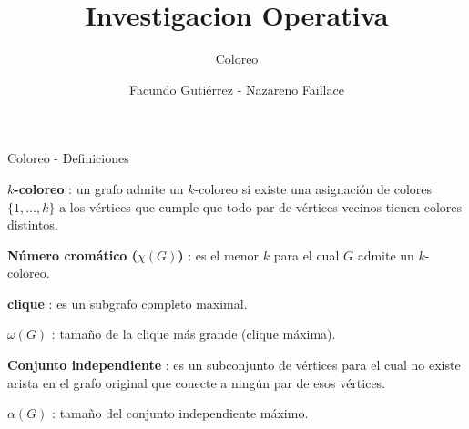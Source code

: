\documentclass[10pt]{beamer}
\title{Investigacion Operativa}
\subtitle{Coloreo}
\date{}
\author{Facundo Gutiérrez - Nazareno Faillace}
\institute{Departamento de Matemática, FCEN, UBA}
\newcommand \anchoPagina{1.0} %
\begin{document}
\maketitle

\begin{frame}{Coloreo - Definiciones}
	\begin{minipage}{\anchoPagina \textwidth}
	\textbf{$k$-coloreo} : un grafo admite un $k$-coloreo si existe una asignaci\'on de colores $\{1,\dots,k\}$ a los v\'ertices que cumple que todo par de v\'ertices vecinos tienen colores distintos.
	
	\vspace{1em}
	\pause
	\textbf{Número cromático ($\chi(G)$)} : es el menor $k$ para el cual $G$ admite un $k$-coloreo.

    \vspace{1em}
    \pause
    \textbf{clique} : es un subgrafo completo maximal.
    
    \vspace{1em}
    \pause
    $\omega(G)$ : tamaño de la clique más grande (clique máxima).
    
    \vspace{1em}
    \pause
    \textbf{Conjunto independiente} : es un subconjunto de v\'ertices para el cual no existe arista en el grafo original que conecte a ning\'un par de esos v\'ertices.
    
    \vspace{1em}
    \pause
    $\alpha(G)$ : tamaño del conjunto independiente máximo.

	\end{minipage}
\end{frame}
\end{document}
